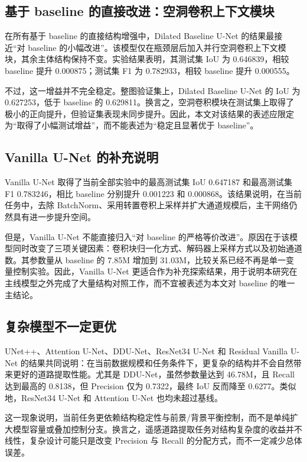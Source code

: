 \documentclass[12pt,a4paper]{ctexart}
\begin{document}
\subsection{基于 baseline 的直接改进：空洞卷积上下文模块}
在所有基于 baseline 的直接结构增强中，Dilated Baseline U-Net 的结果最接近“对 baseline 的小幅改进”。该模型仅在瓶颈层后加入并行空洞卷积上下文模块，其余主体结构保持不变。实验结果表明，其测试集 IoU 为 0.646839，相较 baseline 提升 0.000875；测试集 F1 为 0.782933，相较 baseline 提升 0.000555。

不过，这一增益并不完全稳定。整图验证集上，Dilated Baseline U-Net 的 IoU 为 0.627253，低于 baseline 的 0.629811。换言之，空洞卷积模块在测试集上取得了极小的正向提升，但验证集表现未同步提升。因此，本文对该结果的表述应限定为“取得了小幅测试增益”，而不能表述为“稳定且显著优于 baseline”。

\subsection{Vanilla U-Net 的补充说明}
Vanilla U-Net 取得了当前全部实验中的最高测试集 IoU 0.647187 和最高测试集 F1 0.783246，相比 baseline 分别提升 0.001223 和 0.000868。该结果说明，在当前任务中，去除 BatchNorm、采用转置卷积上采样并扩大通道规模后，主干网络仍然具有进一步提升空间。

但是，Vanilla U-Net 不能直接归入“对 baseline 的严格等价改进”。原因在于该模型同时改变了三项关键因素：卷积块归一化方式、解码器上采样方式以及初始通道数。其参数量从 baseline 的 7.85M 增加到 31.03M，比较关系已经不再是单一变量控制实验。因此，Vanilla U-Net 更适合作为补充探索结果，用于说明本研究在主线模型之外完成了大量结构对照工作，而不宜被表述为本文对 baseline 的唯一主结论。

\subsection{复杂模型不一定更优}
UNet++、Attention U-Net、DDU-Net、ResNet34 U-Net 和 Residual Vanilla U-Net 的结果共同说明：在当前数据规模和任务条件下，更复杂的结构并不会自然带来更好的道路提取性能。尤其是 DDU-Net，虽然参数量达到 46.78M，且 Recall 达到最高的 0.8138，但 Precision 仅为 0.7322，最终 IoU 反而降至 0.6277。类似地，ResNet34 U-Net 和 Attention U-Net 也均未超过基线。

这一现象说明，当前任务更依赖结构稳定性与前景/背景平衡控制，而不是单纯扩大模型容量或叠加控制分支。换言之，遥感道路提取任务对结构复杂度的收益并不线性，复杂设计可能只是改变 Precision 与 Recall 的分配方式，而不一定减少总体误差。
\end{document}
